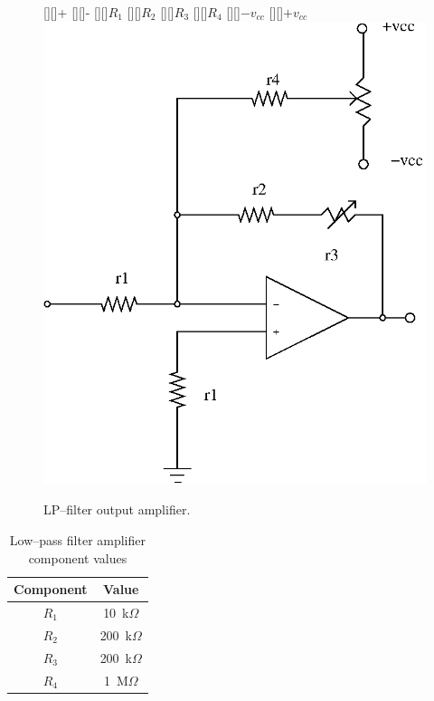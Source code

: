 \begin{figure}[htbp]
\begin{center}
	\psfrag{+}[][]{+} 
	\psfrag{-}[][]{-} 
	[][]{$R_1$} 
	[][]{$R_2$}
	[][]{$R_3$}  
	[][]{$R_4$}  
	[][]{$-v_{cc}$}  
	[][]{$+v_{cc}$}  
	\includegraphics*{amp2.eps}
	\caption{LP--filter output amplifier.}
\label{fig:lp-amp}
\end{center}
\end{figure}

\begin{table}
\begin{center}	
	\begin{tabular}[htpb]{|c|c|} \hline
	Component & Value \\ \hline
	$R_1$ & 10~k$\Omega$ \\
	$R_2$ & 200~k$\Omega$ \\
	$R_3$ & 200~k$\Omega$ \\
	$R_4$ & 1~M$\Omega$ \\
	\hline
	\end{tabular}
	\caption{Low--pass filter amplifier component values}
	\label{table:lp-amp}
\end{center}	
\end{table}

